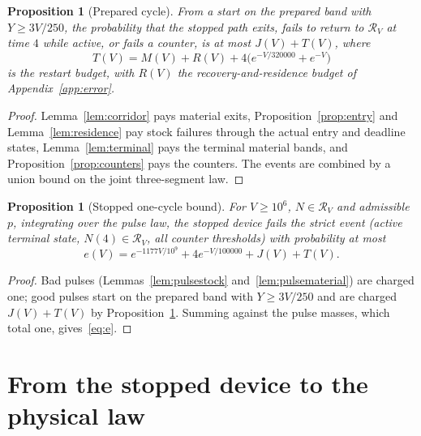 \documentclass[11pt,a4paper]{article}
\theoremstyle{plain}
\newtheorem{proposition}[theorem]{Proposition}
\theoremstyle{definition}
\theoremstyle{remark}
\newcommand{\cR}{\mathcal R}
\begin{document}
\begin{proposition}[Prepared cycle]\label{prop:prepared}
From a start on the prepared band with $Y\ge3V/250$, the probability that the stopped path exits, fails to return to $\cR_V$ at time $4$ while active, or fails a counter, is at most $J(V)+T(V)$, where
\begin{equation}\label{eq:T}
T(V)=M(V)+R(V)+4\bigl(e^{-V/320000}+e^{-V}\bigr)
\end{equation}
is the restart budget, with $R(V)$ the recovery-and-residence budget of Appendix~\ref{app:error}.
\end{proposition}
\begin{proof}
Lemma~\ref{lem:corridor} pays material exits, Proposition~\ref{prop:entry} and Lemma~\ref{lem:residence} pay stock failures through the actual entry and deadline states, Lemma~\ref{lem:terminal} pays the terminal material bands, and Proposition~\ref{prop:counters} pays the counters. The events are combined by a union bound on the joint three-segment law.
\end{proof}

\begin{proposition}[Stopped one-cycle bound]\label{prop:stopped}
For $V\ge10^6$, $N\in\cR_V$ and admissible $p$, integrating over the pulse law, the stopped device fails the strict event (active terminal state, $N(4)\in\cR_V$, all counter thresholds) with probability at most
\begin{equation}\label{eq:e}
e(V)=e^{-1177V/10^{9}}+4e^{-V/100000}+J(V)+T(V).
\end{equation}
\end{proposition}
\begin{proof}
Bad pulses (Lemmas~\ref{lem:pulsestock} and~\ref{lem:pulsematerial}) are charged one; good pulses start on the prepared band with $Y\ge3V/250$ and are charged $J(V)+T(V)$ by Proposition~\ref{prop:prepared}. Summing against the pulse masses, which total one, gives~\eqref{eq:e}.
\end{proof}

\section{From the stopped device to the physical law}\label{sec:transfer}
\end{document}
